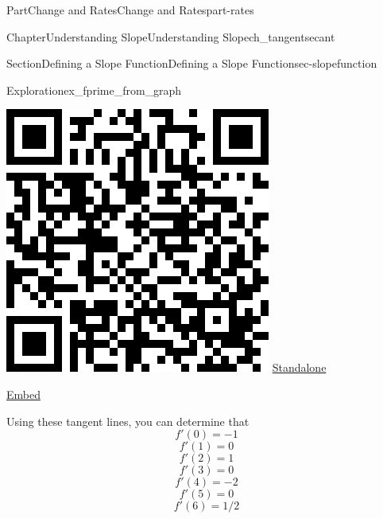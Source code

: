 \documentclass[oneside,10pt,]{tufte-book}
\numberwithin{equation}{chapter}
\begin{document}
\begin{partptx}{Part}{Change and Rates}{}{Change and Rates}{}{}{part-rates}
\begin{chapterptx}{Chapter}{Understanding Slope}{}{Understanding Slope}{}{}{ch_tangentsecant}
\begin{sectionptx}{Section}{Defining a Slope Function}{}{Defining a Slope Function}{}{}{sec-slopefunction}
\begin{exploration}{Exploration}{}{ex_fprime_from_graph}
\begin{enumerate}[font=\bfseries,label=(\alph*),ref=\alph*]
\begin{sidebyside}{2}{0.075}{0.075}{0.17}
\begin{sbspanel}{0.21}
\includegraphics[width=\linewidth]{generated/qrcode/ex_fprime_from_graph-2-2-2-1.png}
\href{http://webwork.bridgew.edu/oer/functions_at_work/ex_fprime_from_graph-2-2-2-1.html}{Standalone}%
\par
\href{http://webwork.bridgew.edu/oer/functions_at_work/ex_fprime_from_graph-2-2-2-1-if.html}{Embed}%
\end{sbspanel}%
\end{sidebyside}%
%
\par
Using these tangent lines, you can determine that%
\begin{equation*}
f'(0) = -1
\end{equation*}
%
\begin{equation*}
f'(1) = 0
\end{equation*}
%
\begin{equation*}
f'(2) = 1
\end{equation*}
%
\begin{equation*}
f'(3) = 0
\end{equation*}
%
\begin{equation*}
f'(4) = -2
\end{equation*}
%
\begin{equation*}
f'(5) = 0
\end{equation*}
%
\begin{equation*}
f'(6) = 1/2
\end{equation*}

\end{enumerate}
\end{exploration}
\end{sectionptx}
\end{chapterptx}
\end{partptx}
\end{document}
